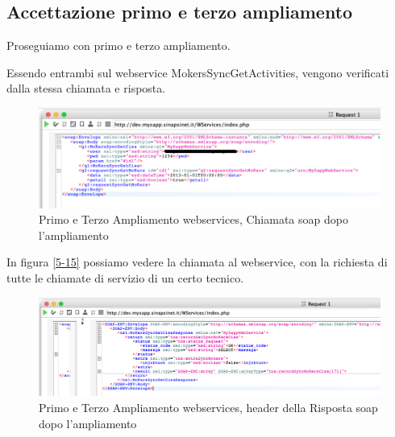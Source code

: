 \subsection{Accettazione primo e terzo ampliamento}
\begin{flushleft}
	Proseguiamo con primo e terzo ampliamento.
	
	Essendo entrambi sul webservice MokersSyncGetActivities, vengono verificati dalla stessa chiamata e risposta.
\end{flushleft}
\begin{figure}[!h] 
	\centering
	\includegraphics[scale = 0.5]{immagini/webservices/ampliamenti/accettazione/3ampl_soap_chiamata.png}
	\caption{Primo e Terzo Ampliamento webservices, Chiamata \gls{soap} dopo l'ampliamento}
	\label{fig:5-15}
\end{figure}

\begin{flushleft}
	In figura \ref{5-15} possiamo vedere la chiamata al webservice, con la richiesta di tutte le chiamate di servizio di un certo tecnico.
\end{flushleft}

\begin{figure}[!h] 
	\centering
	\includegraphics[scale = 0.5]{immagini/webservices/ampliamenti/accettazione/3ampl__risposta_soap_header.png}
	\caption{Primo e Terzo Ampliamento webservices, header della Risposta \gls{soap} dopo l'ampliamento}
	\label{fig:5-16}
\end{figure}

